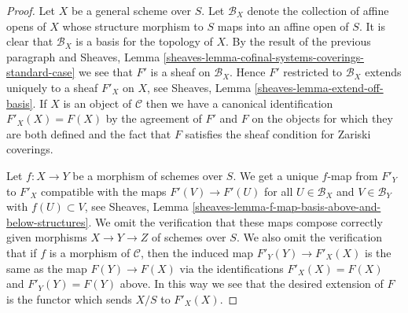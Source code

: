 \documentclass[10pt,a4paper]{amsart}
\theoremstyle{plain}
\theoremstyle{definition}
\theoremstyle{remark}
\numberwithin{equation}{subsection}
\begin{document}
\begin{proof}
\medskip\noindent
Let $X$ be a general scheme over $S$. Let $\mathcal{B}_X$ denote
the collection of affine opens of $X$ whose structure morphism
to $S$ maps into an affine open of $S$. It is clear that
$\mathcal{B}_X$ is a basis for the topology of $X$.
By the result of the previous paragraph and Sheaves, Lemma
\ref{sheaves-lemma-cofinal-systems-coverings-standard-case}
we see that $F'$ is a sheaf on $\mathcal{B}_X$.
Hence $F'$ restricted to $\mathcal{B}_X$
extends uniquely to a sheaf $F'_X$ on $X$, see
Sheaves, Lemma \ref{sheaves-lemma-extend-off-basis}.
If $X$ is an object of $\mathcal{C}$ then we have a canonical
identification $F'_X(X) = F(X)$ by the agreement of $F'$ and $F$
on the objects for which they are both defined and
the fact that $F$ satisfies the sheaf condition for
Zariski coverings.

\medskip\noindent
Let $f : X \to Y$ be a morphism of schemes over $S$.
We get a unique $f$-map from $F'_Y$ to $F'_X$ compatible
with the maps $F'(V) \to F'(U)$ for all
$U \in \mathcal{B}_X$ and $V \in \mathcal{B}_Y$
with $f(U) \subset V$, see
Sheaves, Lemma \ref{sheaves-lemma-f-map-basis-above-and-below-structures}.
We omit the verification that these maps compose
correctly given morphisms $X \to Y \to Z$ of schemes over $S$.
We also omit the verification that if $f$ is a morphism
of $\mathcal{C}$, then the induced map $F'_Y(Y) \to F'_X(X)$
is the same as the map $F(Y) \to F(X)$ via the identifications
$F'_X(X) = F(X)$ and $F'_Y(Y) = F(Y)$ above.
In this way we see that the desired extension of
$F$ is the functor which sends $X/S$ to $F'_X(X)$.


\end{proof}
\end{document}

